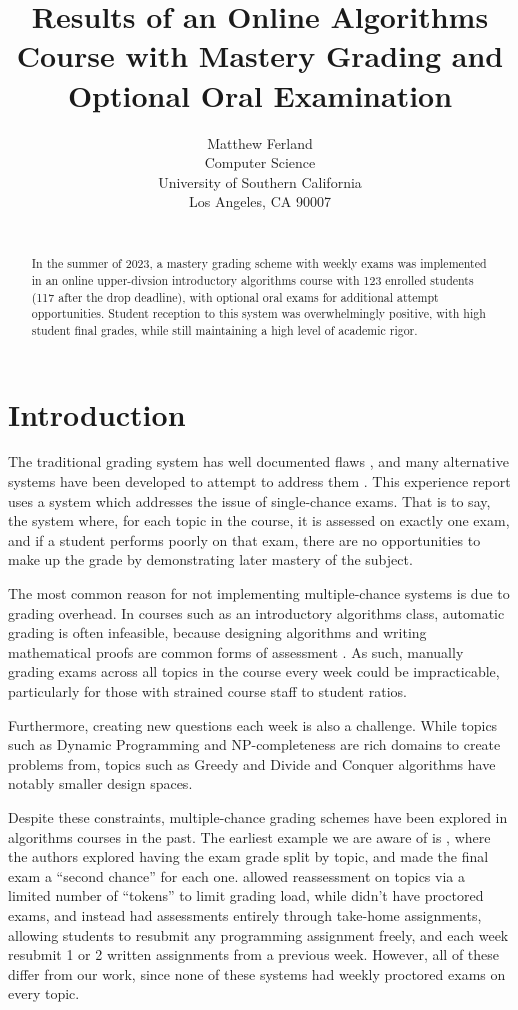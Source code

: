 \documentclass{article}
\title{Results of an Online Algorithms Course with Mastery Grading and Optional Oral Examination}
\author{
Matthew Ferland\\
Computer Science\\
University of Southern California\\
Los Angeles, CA 90007\\
\email{mferland@usc.edu}\\
}
\begin{document}
\maketitle
\thispagestyle{empty}
\pagestyle{empty}

\begin{abstract}
In the summer of 2023, a mastery grading scheme with weekly exams was implemented in an online upper-divsion introductory algorithms course with 123 enrolled students (117 after the drop deadline), with optional oral exams for additional attempt opportunities. Student reception to this system was overwhelmingly positive, with high student final grades, while still maintaining a high level of academic rigor.
\end{abstract}

\section{Introduction}
The traditional grading system has well documented flaws \cite{iamarino2014benefits, link2019traditional}, and many alternative systems have been developed to attempt to address them \cite{cooper2020techniques, feldman2023grading, nilson2015specifications}. This experience report uses a system which addresses the issue of single-chance exams. That is to say, the system where, for each topic in the course, it is assessed on exactly one exam, and if a student performs poorly on that exam, there are no opportunities to make up the grade by demonstrating later mastery of the subject.

The most common reason for not implementing multiple-chance systems is due to grading overhead. In courses such as an introductory algorithms class, automatic grading is often infeasible, because designing algorithms and writing mathematical proofs are common forms of assessment \cite{luu2023algorithms}. As such, manually grading exams across all topics in the course every week could be impracticable, particularly for those with strained course staff to student ratios.

Furthermore, creating new questions each week is also a challenge. While topics such as Dynamic Programming and NP-completeness are rich domains to create problems from, topics such as Greedy and Divide and Conquer algorithms have notably smaller design spaces.

Despite these constraints, multiple-chance grading schemes have been explored in algorithms courses in the past. The earliest example we are aware of is \cite{shindler2020experience}, where the authors explored having the exam grade split by topic, and made the final exam a ``second chance'' for each one. \cite{chen2022experience} allowed reassessment on topics via a limited number of ``tokens'' to limit grading load, while \cite{weber2023using} didn't have proctored exams, and instead had assessments entirely through take-home assignments, allowing students to resubmit any programming assignment freely, and each week resubmit 1 or 2 written assignments from a previous week. However, all of these differ from our work, since none of these systems had weekly proctored exams on every topic.
\end{document}

